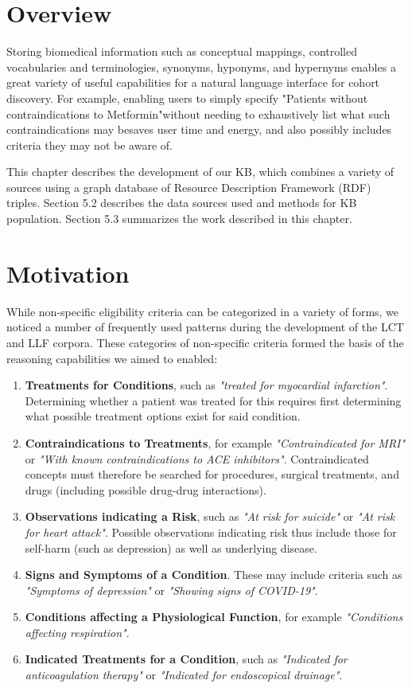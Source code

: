\documentclass[../main.tex]{subfiles}
\begin{document}
\section{Overview}

Storing biomedical information such as conceptual mappings, controlled vocabularies and terminologies, synonyms, hyponyms, and hypernyms enables a great variety of useful capabilities for a natural language interface for cohort discovery. For example, enabling users to simply specify "Patients without contraindications to Metformin"\textemdash without needing to exhaustively list what such contraindications may be\textemdash saves user time and energy, and also possibly includes criteria they may not be aware of.  

This chapter describes the development of our KB, which combines a variety of sources using a graph database of Resource Description Framework (RDF) \cite{manola2004rdf} triples. Section 5.2 describes the data sources used and methods for KB population. Section 5.3 summarizes the work described in this chapter.

\section{Motivation}

While non-specific eligibility criteria can be categorized in a variety of forms, we noticed a number of frequently used patterns during the development of the LCT and LLF corpora. These categories of non-specific criteria formed the basis of the reasoning capabilities we aimed to enabled:

\begin{enumerate}
    \item \textbf{Treatments for Conditions}, such as \textit{"treated for myocardial infarction"}. Determining whether a patient was treated for this requires first determining what possible treatment options exist for said condition.
    \item \textbf{Contraindications to Treatments}, for example \textit{"Contraindicated for MRI"} or \textit{"With known contraindications to ACE inhibitors"}. Contraindicated concepts must therefore be searched for procedures, surgical treatments, and drugs (including possible drug-drug interactions).
    \item \textbf{Observations indicating a Risk}, such as \textit{"At risk for suicide"} or \textit{"At risk for heart attack"}. Possible observations indicating risk thus include those for self-harm (such as depression) as well as underlying disease.
    \item \textbf{Signs and Symptoms of a Condition}. These may include criteria such as \textit{"Symptoms of depression"} or \textit{"Showing signs of COVID-19"}.
    \item \textbf{Conditions affecting a Physiological Function}, for example \textit{"Conditions affecting respiration"}.
    \item \textbf{Indicated Treatments for a Condition}, such as \textit{"Indicated for anticoagulation therapy"} or \textit{"Indicated for endoscopical drainage"}. 
\end{enumerate}
\end{document}
